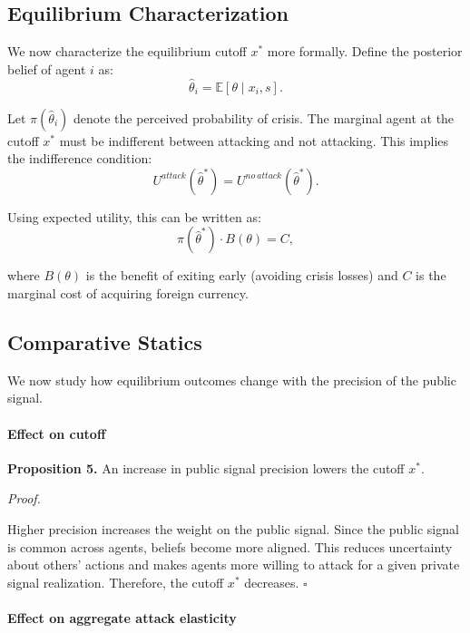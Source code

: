 \subsection{Equilibrium Characterization}

We now characterize the equilibrium cutoff $x^*$ more formally. Define the posterior belief of agent $i$ as:
\begin{equation}
\hat{\theta}_i = \mathbb{E}[\theta \mid x_i, s].
\end{equation}

Let $\pi(\hat{\theta}_i)$ denote the perceived probability of crisis. The marginal agent at the cutoff $x^*$ must be indifferent between attacking and not attacking. This implies the indifference condition:
\begin{equation}
U^{attack}(\hat{\theta}^*) = U^{no\ attack}(\hat{\theta}^*).
\end{equation}

Using expected utility, this can be written as:
\begin{equation}
\pi(\hat{\theta}^*) \cdot B(\theta) = C,
\end{equation}

where $B(\theta)$ is the benefit of exiting early (avoiding crisis losses) and $C$ is the marginal cost of acquiring foreign currency.

\subsection{Comparative Statics}

We now study how equilibrium outcomes change with the precision of the public signal.

\paragraph{Effect on cutoff}

\textbf{Proposition 5.} An increase in public signal precision lowers the cutoff $x^*$.

\textit{Proof.}

Higher precision increases the weight on the public signal. Since the public signal is common across agents, beliefs become more aligned. This reduces uncertainty about others' actions and makes agents more willing to attack for a given private signal realization. Therefore, the cutoff $x^*$ decreases. \hfill $\square$

\paragraph{Effect on aggregate attack elasticity}

